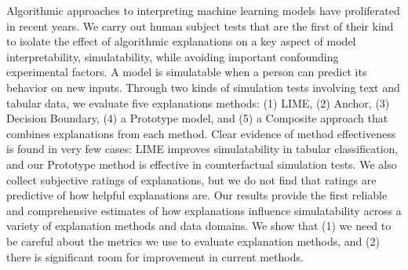 Algorithmic approaches to interpreting machine learning models have proliferated in recent years. We carry out human subject tests that are the first of their kind to isolate the effect of algorithmic explanations on a key aspect of model interpretability, simulatability, while avoiding important confounding experimental factors. A model is simulatable when a person can predict its behavior on new inputs. Through two kinds of simulation tests involving text and tabular data, we evaluate five explanations methods: (1) LIME, (2) Anchor, (3) Decision Boundary, (4) a Prototype model, and (5) a Composite approach that combines explanations from each method. Clear evidence of method effectiveness is found in very few cases: LIME improves simulatability in tabular classification, and our Prototype method is effective in counterfactual simulation tests. We also collect subjective ratings of explanations, but we do not find that ratings are predictive of how helpful explanations are. Our results provide the first reliable and comprehensive estimates of how explanations influence simulatability across a variety of explanation methods and data domains. We show that (1) we need to be careful about the metrics we use to evaluate explanation methods, and (2) there is significant room for improvement in current methods.
